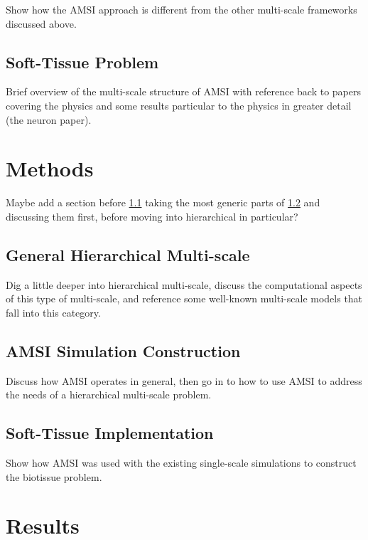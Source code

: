 \documentclass[review]{siamart1116}
\begin{document}
Show how the AMSI approach is different from the other multi-scale frameworks discussed above.

\subsection{Soft-Tissue Problem}\label{sec:bio}

Brief overview of the multi-scale structure of AMSI with reference back to papers covering the physics and some results particular to the physics in greater detail (the neuron paper).

\section{Methods}\label{sec:methods}

Maybe add a section before \ref{sec:hierarchic} taking the most generic parts of \ref{sec:amsi-construction} and discussing them first, before moving into hierarchical in particular?

\subsection{General Hierarchical Multi-scale}\label{sec:hierarchic}

Dig a little deeper into hierarchical multi-scale, discuss the computational aspects of this type of multi-scale, and reference some well-known multi-scale models that fall into this category.

\subsection{AMSI Simulation Construction}\label{sec:amsi-construction}

Discuss how AMSI operates in general, then go in to how to use AMSI to address the needs of a hierarchical multi-scale problem.

\subsection{Soft-Tissue Implementation}\label{sec:bio-construction}

Show how AMSI was used with the existing single-scale simulations to construct the biotissue problem.

\section{Results}\label{sec:results}
\end{document}
